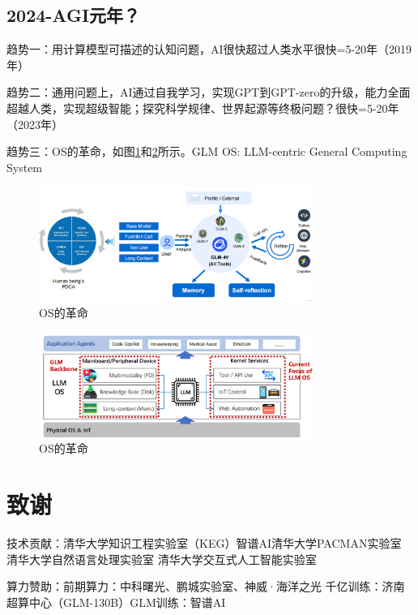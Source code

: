 \subsection{2024-AGI元年？}

趋势一：用计算模型可描述的认知问题，AI很快超过人类水平很快=5-20年（2019年）

趋势二：通用问题上，AI通过自我学习，实现GPT到GPT-zero的升级，能力全面超越人类，实现超级智能；探究科学规律、世界起源等终极问题？很快=5-20年（2023年）

趋势三：OS的革命，如图\ref{fig:osrevolution}和\ref{fig:osrevolution2}所示。GLM OS: LLM-centric General Computing System

\begin{figure}[H]
	\centering
	\includegraphics[width=0.8\textwidth]{figures/chapter1/fig19.1.png}
	\caption{OS的革命}
	\label{fig:osrevolution}
\end{figure}

\begin{figure}[H]
	\centering
	\includegraphics[width=0.8\textwidth]{figures/chapter1/fig19.2.png}
	\caption{OS的革命}
	\label{fig:osrevolution2}
\end{figure}

\section{致谢}

技术贡献：清华大学知识工程实验室（KEG）智谱AI清华大学PACMAN实验室 清华大学自然语言处理实验室 清华大学交互式人工智能实验室

算力赞助：前期算力：中科曙光、鹏城实验室、神威·海洋之光 千亿训练：济南超算中心（GLM-130B）GLM训练：智谱AI


\begin{flushleft}
\nocite{*}                   %
\end{flushleft}
